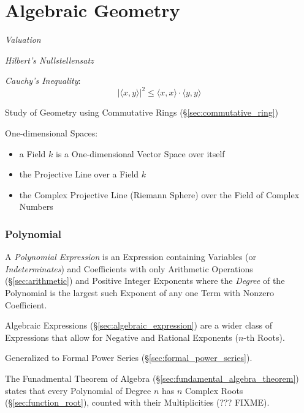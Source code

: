 \part{Algebraic Geometry}\label{part:algebraic_geometry}

\emph{Valuation}

\emph{Hilbert's Nullstellensatz}

\emph{Cauchy's Inequality}:
\[
    |\langle x,y \rangle|^2 \leq \langle x,x \rangle \cdot \langle
    y,y \rangle
\]

Study of Geometry using Commutative Rings
(\S\ref{sec:commutative_ring})

One-dimensional Spaces:

\begin{itemize}
\item a Field $k$ is a One-dimensional Vector Space over itself
\item the Projective Line over a Field $k$
\item the Complex Projective Line (Riemann Sphere) over the Field of Complex
  Numbers
\end{itemize}



\section{Polynomial}\label{sec:polynomial}

A \emph{Polynomial Expression} is an Expression containing Variables (or
\emph{Indeterminates}) and Coefficients with only Arithmetic Operations
(\S\ref{sec:arithmetic}) and Positive Integer Exponents where the \emph{Degree}
of the Polynomial is the largest such Exponent of any one Term with Nonzero
Coefficient.

\fist Algebraic Expressions (\S\ref{sec:algebraic_expression}) are a wider
class of Expressions that allow for Negative and Rational Exponents ($n$-th
Roots).

\fist Generalized to Formal Power Series (\S\ref{sec:formal_power_series}).

The Funadmental Theorem of Algebra (\S\ref{sec:fundamental_algebra_theorem})
states that every Polynomial of Degree $n$ has $n$ Complex Roots
(\S\ref{sec:function_root}), counted with their Multiplicities (??? FIXME).


